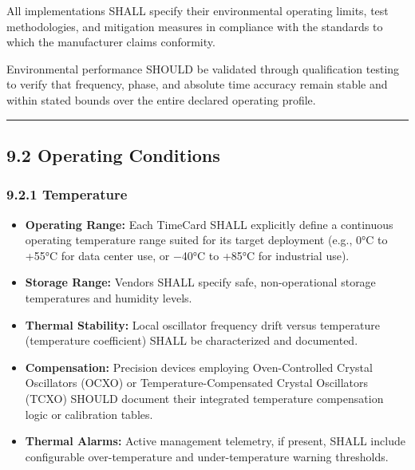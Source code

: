 All implementations SHALL specify their environmental operating limits,
test methodologies, and mitigation measures in compliance with the
standards to which the manufacturer claims conformity.

Environmental performance SHOULD be validated through qualification
testing to verify that frequency, phase, and absolute time accuracy
remain stable and within stated bounds over the entire declared
operating profile.

\begin{center}\rule{0.5\linewidth}{0.5pt}\end{center}

\subsection{9.2 Operating Conditions}\label{operating-conditions}

\subsubsection{9.2.1 Temperature}\label{temperature}

\begin{itemize}
\tightlist
\item
  \textbf{Operating Range:} Each TimeCard SHALL explicitly define a
  continuous operating temperature range suited for its target
  deployment (e.g., 0°C to +55°C for data center use, or −40°C to +85°C
  for industrial use).\\
\item
  \textbf{Storage Range:} Vendors SHALL specify safe, non-operational
  storage temperatures and humidity levels.\\
\item
  \textbf{Thermal Stability:} Local oscillator frequency drift versus
  temperature (temperature coefficient) SHALL be characterized and
  documented.\\
\item
  \textbf{Compensation:} Precision devices employing Oven-Controlled
  Crystal Oscillators (OCXO) or Temperature-Compensated Crystal
  Oscillators (TCXO) SHOULD document their integrated temperature
  compensation logic or calibration tables.\\
\item
  \textbf{Thermal Alarms:} Active management telemetry, if present,
  SHALL include configurable over-temperature and under-temperature
  warning thresholds.
\end{itemize}

